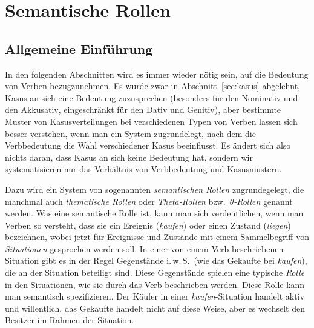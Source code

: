 \section{Semantische Rollen}

\label{sec:semantischerollen}

\subsection{Allgemeine Einführung}

In den folgenden Abschnitten wird es immer wieder nötig sein, auf die Bedeutung von Verben bezugzunehmen.
Es wurde zwar in Abschnitt~\ref{sec:kasus} abgelehnt, Kasus an sich eine Bedeutung zuzusprechen (besonders für den Nominativ und den Akkusativ, eingeschränkt für den Dativ und Genitiv), aber bestimmte Muster von Kasusverteilungen bei verschiedenen Typen von Verben lassen sich besser verstehen, wenn man ein System zugrundelegt, nach dem die Verbbedeutung die Wahl verschiedener Kasus beeinflusst.
Es ändert sich also nichts daran, dass Kasus an sich keine Bedeutung hat, sondern wir systematisieren nur das Verhältnis von Verbbedeutung und Kasusmustern.

Dazu wird ein System von sogenannten \textit{semantischen Rollen} zugrundegelegt, die manchmal auch \textit{thematische Rollen} oder \textit{Theta-Rollen} bzw.\ $\theta$\textit{-Rollen} genannt werden.
Was eine semantische Rolle ist, kann man sich verdeutlichen, wenn man Verben so versteht, dass sie ein Ereignis (\zB \textit{kaufen}) oder einen Zustand (\zB \textit{liegen}) bezeichnen, wobei jetzt für Ereignisse und Zustände mit einem Sammelbegriff von \textit{Situationen} gesprochen werden soll.
In einer von einem Verb beschriebenen Situation gibt es in der Regel Gegenstände i.\,w.\,S.\ (wie das Gekaufte bei \textit{kaufen}), die an der Situation beteiligt sind.
Diese Gegenstände spielen eine typische \textit{Rolle} in den Situationen, wie sie durch das Verb beschrieben werden.
Diese Rolle kann man semantisch spezifizieren.
Der Käufer in einer \textit{kaufen}-Situation handelt \zB aktiv und willentlich, das Gekaufte handelt nicht auf diese Weise, aber es wechselt den Besitzer im Rahmen der Situation.


